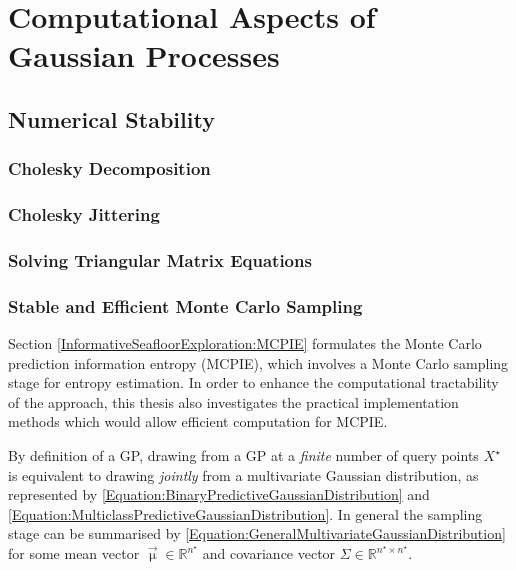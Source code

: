 \chapter{Computational Aspects of Gaussian Processes}
\label{Appendix:ComputationalAspects}

	\section{Numerical Stability}
	\label{Appendix:ComputationalAspects:NumericalStability}
	
		\subsection{Cholesky Decomposition}
		\label{Appendix:ComputationalAspects:NumericalStability:Cholesky}

		\subsection{Cholesky Jittering}
		\label{Appendix:ComputationalAspects:NumericalStability:CholeskyJittering}
				
		\subsection{Solving Triangular Matrix Equations}
		\label{Appendix:ComputationalAspects:NumericalStability:SolvingTriangularMatrices}
		
		\subsection{Stable and Efficient Monte Carlo Sampling}
		\label{Appendix:ComputationalAspects:NumericalStability:MonteCarlo}
		
			Section \ref{InformativeSeafloorExploration:MCPIE} formulates the Monte Carlo prediction information entropy (MCPIE), which involves a Monte Carlo sampling stage for entropy estimation. In order to enhance the computational tractability of the approach, this thesis also investigates the practical implementation methods which would allow efficient computation for MCPIE.
			
			By definition of a GP, drawing from a GP at a \textit{finite} number of query points $X^{\star}$ is equivalent to drawing \textit{jointly} from a multivariate Gaussian distribution, as represented by \eqref{Equation:BinaryPredictiveGaussianDistribution} and \eqref{Equation:MulticlassPredictiveGaussianDistribution}. In general the sampling stage can be summarised by \eqref{Equation:GeneralMultivariateGaussianDistribution} for some mean vector $\vec{\upmu} \in \mathbb{R}^{n^{\star}}$ and covariance vector $\Sigma \in \mathbb{R}^{n^{\star} \times n^{\star}}$. 
			

